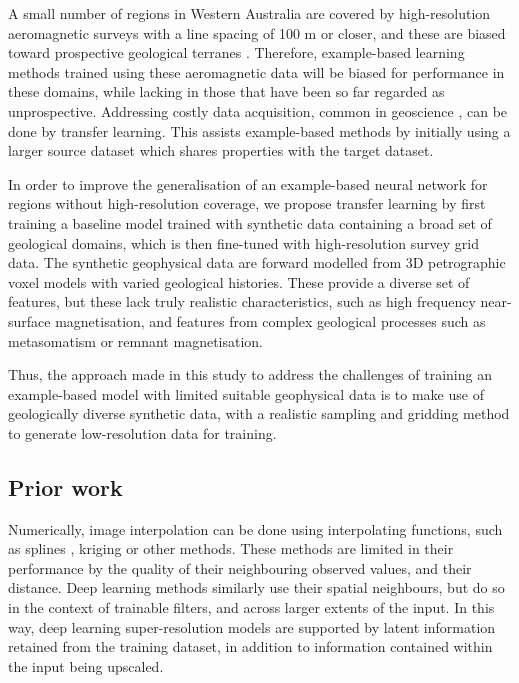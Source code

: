A small number of regions in Western Australia are covered by high-resolution aeromagnetic surveys with a line spacing of 100 m or closer, and these are biased toward prospective geological terranes \parencite{howardAirborneGeophysicalCoverage2004}.
Therefore, example-based learning methods trained using these aeromagnetic data will be biased for performance in these domains, while lacking in those that have been so far regarded as unprospective.
Addressing costly data acquisition, common in geoscience \parencite{dawsonImpactDatasetSize2023}, can be done by transfer learning.
This assists example-based methods by initially using a larger source dataset which shares properties with the target dataset.

In order to improve the generalisation of an example-based neural network for regions without high-resolution coverage, we propose transfer learning \parencite{tanSurveyDeepTransfer2018} by first training a baseline model trained with synthetic data containing a broad set of geological domains, which is then fine-tuned with high-resolution survey grid data.
The synthetic geophysical data \parencite{jessellNoddyverseMassiveData2022} are forward modelled from 3D petrographic voxel models with varied geological histories.
These provide a diverse set of features, but these lack truly realistic characteristics, such as high frequency near-surface magnetisation, and features from complex geological processes such as metasomatism or remnant magnetisation.

Thus, the approach made in this study to address the challenges of training an example-based model with limited suitable geophysical data is to make use of geologically diverse synthetic data, with a realistic sampling and gridding method to generate low-resolution data for training.

\subsection{Prior work}
Numerically, image interpolation can be done using interpolating functions, such as splines \parencite{keysCubicConvolutionInterpolation1981}, kriging \parencite{hansenInterpretiveGriddingAnisotropic1993} or other methods.
These methods are limited in their performance by the quality of their neighbouring observed values, and their distance.
Deep learning methods similarly use their spatial neighbours, but do so in the context of trainable filters, and across larger extents of the input.
In this way, deep learning super-resolution models are supported by latent information retained from the training dataset, in addition to information contained within the input being upscaled.


